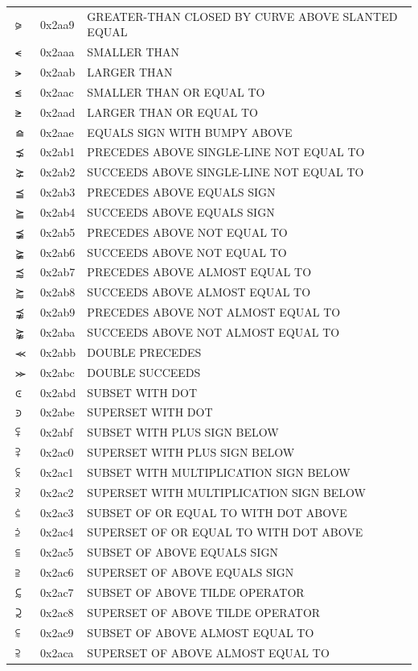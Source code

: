 \documentclass[12pt, twoside]{article}
\begin{document}
\begin{longtable}{L{1.0cm} L{2.0cm} >{\footnotesize}L{10cm}}
$⪩$&0x2aa9&GREATER-THAN CLOSED BY CURVE ABOVE SLANTED EQUAL\\
$⪪$&0x2aaa&SMALLER THAN\\
$⪫$&0x2aab&LARGER THAN\\
$⪬$&0x2aac&SMALLER THAN OR EQUAL TO\\
$⪭$&0x2aad&LARGER THAN OR EQUAL TO\\
$⪮$&0x2aae&EQUALS SIGN WITH BUMPY ABOVE\\
$⪱$&0x2ab1&PRECEDES ABOVE SINGLE-LINE NOT EQUAL TO\\
$⪲$&0x2ab2&SUCCEEDS ABOVE SINGLE-LINE NOT EQUAL TO\\
$⪳$&0x2ab3&PRECEDES ABOVE EQUALS SIGN\\
$⪴$&0x2ab4&SUCCEEDS ABOVE EQUALS SIGN\\
$⪵$&0x2ab5&PRECEDES ABOVE NOT EQUAL TO\\
$⪶$&0x2ab6&SUCCEEDS ABOVE NOT EQUAL TO\\
$⪷$&0x2ab7&PRECEDES ABOVE ALMOST EQUAL TO\\
$⪸$&0x2ab8&SUCCEEDS ABOVE ALMOST EQUAL TO\\
$⪹$&0x2ab9&PRECEDES ABOVE NOT ALMOST EQUAL TO\\
$⪺$&0x2aba&SUCCEEDS ABOVE NOT ALMOST EQUAL TO\\
$⪻$&0x2abb&DOUBLE PRECEDES\\
$⪼$&0x2abc&DOUBLE SUCCEEDS\\
$⪽$&0x2abd&SUBSET WITH DOT\\
$⪾$&0x2abe&SUPERSET WITH DOT\\
$⪿$&0x2abf&SUBSET WITH PLUS SIGN BELOW\\
$⫀$&0x2ac0&SUPERSET WITH PLUS SIGN BELOW\\
$⫁$&0x2ac1&SUBSET WITH MULTIPLICATION SIGN BELOW\\
$⫂$&0x2ac2&SUPERSET WITH MULTIPLICATION SIGN BELOW\\
$⫃$&0x2ac3&SUBSET OF OR EQUAL TO WITH DOT ABOVE\\
$⫄$&0x2ac4&SUPERSET OF OR EQUAL TO WITH DOT ABOVE\\
$⫅$&0x2ac5&SUBSET OF ABOVE EQUALS SIGN\\
$⫆$&0x2ac6&SUPERSET OF ABOVE EQUALS SIGN\\
$⫇$&0x2ac7&SUBSET OF ABOVE TILDE OPERATOR\\
$⫈$&0x2ac8&SUPERSET OF ABOVE TILDE OPERATOR\\
$⫉$&0x2ac9&SUBSET OF ABOVE ALMOST EQUAL TO\\
$⫊$&0x2aca&SUPERSET OF ABOVE ALMOST EQUAL TO\\

\end{longtable}
\end{document}
